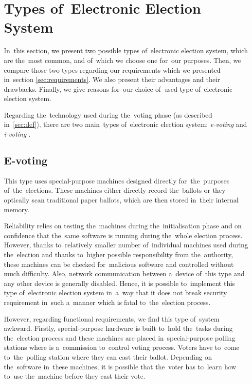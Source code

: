 \section{Types of~Electronic Election System}

In~this section, we present two possible types of~electronic election system, which are the~most common, and of~which we choose one for~our purposes. Then, we compare those two types regarding our requirements which we presented in~section \ref{sec:requirements}. We also present their advantages and their drawbacks. Finally, we give reasons for~our choice of~used type of~electronic election system.

Regarding the~technology used during the~voting phase (as described in~\ref{sec:def}), there are two main~types of~electronic election system: \emph{e-voting} and \emph{i-voting} \cite{Brit}.

\subsection{E-voting} 
This type uses special-purpose machines designed directly for~the~purposes of~the~elections. These machines either directly record the~ballots or they optically scan traditional paper ballots, which are then stored in~their internal memory. 

Reliability relies on testing the~machines during the~initialisation phase and on confidence that the~same software is running during the~whole election process. However, thanks to~relatively smaller number of~individual machines used during the~election and thanks to~higher possible responsibility from the~authority, these machines can be checked for~malicious software and controlled without much difficulty. Also, network communication between a~device of~this type and any other device is generally disabled. Hence, it is possible to~implement this type of~electronic election system in~a~way that it does not break security requirement in~such a~manner which is fatal to~the~election process. 

However, regarding functional requirements, we find this type of~system awkward. Firstly, special-purpose hardware is built to~hold the~tasks during the~election process and these machines are placed in~special-purpose polling stations where is a~commission to~control voting process. Voters have to~come to~the~polling station where they can cast their ballot. Depending on the~software in~these machines, it is possible that the~voter has to~learn how to~use the~machine before they cast their vote.
